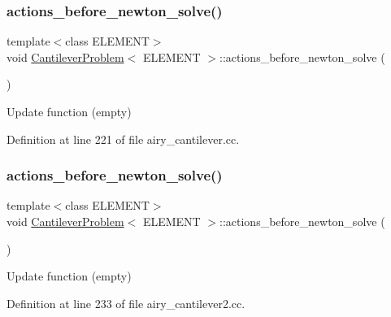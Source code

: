 \subsubsection{\texorpdfstring{actions\+\_\+before\+\_\+newton\+\_\+solve()}{actions\_before\_newton\_solve()}\hspace{0.1cm}{\footnotesize\ttfamily [1/2]}}
{\footnotesize\ttfamily template$<$class E\+L\+E\+M\+E\+NT$>$ \\
void \hyperlink{classCantileverProblem}{Cantilever\+Problem}$<$ E\+L\+E\+M\+E\+NT $>$\+::actions\+\_\+before\+\_\+newton\+\_\+solve (\begin{DoxyParamCaption}{ }\end{DoxyParamCaption})\hspace{0.3cm}{\ttfamily [inline]}}



Update function (empty) 



Definition at line 221 of file airy\+\_\+cantilever.\+cc.

\mbox{\label{classCantileverProblem_a293902b825898ce043ffce3f0691f5a5}} 
\subsubsection{\texorpdfstring{actions\+\_\+before\+\_\+newton\+\_\+solve()}{actions\_before\_newton\_solve()}\hspace{0.1cm}{\footnotesize\ttfamily [2/2]}}
{\footnotesize\ttfamily template$<$class E\+L\+E\+M\+E\+NT$>$ \\
void \hyperlink{classCantileverProblem}{Cantilever\+Problem}$<$ E\+L\+E\+M\+E\+NT $>$\+::actions\+\_\+before\+\_\+newton\+\_\+solve (\begin{DoxyParamCaption}{ }\end{DoxyParamCaption})\hspace{0.3cm}{\ttfamily [inline]}}



Update function (empty) 



Definition at line 233 of file airy\+\_\+cantilever2.\+cc.

